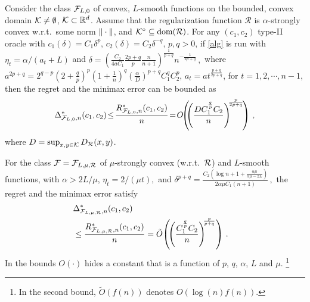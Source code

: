 \begin{theorem}
\label{thm:ub}
Consider the class $\mathcal{F}_{L,0}$ of convex, $L$-smooth functions on the bounded, convex domain $\mathcal{K}\ne \emptyset$, $\mathcal{K} \subset \mathbb{R}^d$.
Assume that the regularization function $\mathcal{R}$ is $\alpha$-strongly convex w.r.t.\  some norm $\|\cdot\|$, and $\mathcal{K}^\circ\subseteq \operatorname{dom}(\mathcal{R})$.
For any $(c_1,c_2)$ type-II oracle 
 with $c_1(\delta) = C_1 \delta^p$, $c_2(\delta) = C_2 \delta^{-q}$, $p,q>0$, 
 if \cref{alg} is run with $\eta_t = \alpha/(a_t+L)$ and
 $
 \delta = \left( \tfrac{C_2}{4aC_1}\tfrac{2p+q}{p}\tfrac{n}{n+1}\right)^{\frac{1}{p+q}}n^{-\frac{1}{2p+q}} \,,$  where
 $a^{2p+q} =2^{q-p}\left( 2+\tfrac{q}{p} \right)^p\left(1+ \tfrac{1}{n} \right)^q \left( \tfrac{\alpha}{D} \right)^{p+q}C_1^q C_2^p $,
 $a_t = a t^{\frac{p+q}{2p+q}}$, for $t=1, 2, \cdots, n-1$,
then  the regret and the minimax error %
can be bounded as
 \[
 \Delta_{\F_{L,0},n}^*(c_1,c_2)\!\le \!
 \frac{R_{\F_{L,0},n}^*(c_1,c_2)}{n}\!=\! O\!\!\left(\!\!\left(\dfrac{DC_1^{\frac{q}{p}}C_2}{n}\right)^{\!\!\frac{p}{2p+q}}\!\right)\,,
\vspace{-0.3cm}
 \]
 where $D=\sup_{x,y\in \mathcal{K}} D_{\mathcal{R}}(x,y)$.
 
For the class $\mathcal{F}=\mathcal{F}_{L,\mu,\mathcal{R}}$ of $\mu$-strongly convex (w.r.t.\  $\mathcal{R}$) and $L$-smooth functions, with $\alpha >2L/\mu$, 
$
 \eta_t = 2/(\mu t),
$ and 
$
\delta^{p+q} =  \tfrac{C_2\left( \log n+1+\tfrac{\alpha \mu}{\alpha \mu -2L}\right)}{2\alpha \mu C_1 (n+1)} \,,
$
the regret and the minimax error satisfy
\begin{align*}
\lefteqn{\Delta_{\F_{L,\mu,\cR},n}^*(c_1,c_2) } \\
& \le  \frac{R_{\F_{L,\mu,\cR},n}^*(c_1,c_2)}{n} =  \tilde{O}\!\left( \!\left(\dfrac{C_1^{\frac{q}{p}} C_2}{n} \right)^{\!\!\frac{p}{p+q}} \right)\,.
\vspace{-0.5cm}
\end{align*}
In the bounds $O(\cdot)$ hides a constant that is a function of $p$, $q$, $\alpha$, $L$ and $\mu$.%
\footnote{In the second bound, $\tilde{O}(f(n))$ denotes $O(\log(n) f(n))$.}
\end{theorem}

